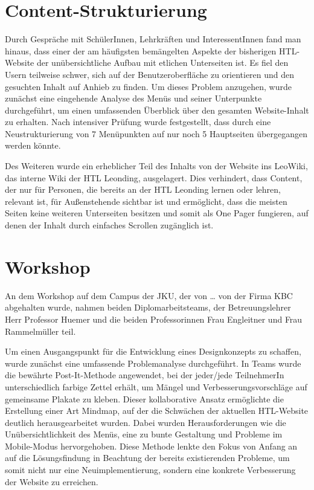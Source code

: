 \section{Content-Strukturierung}
Durch Gespräche mit SchülerInnen, Lehrkräften und InteressentInnen fand man hinaus, dass einer der am häufigsten bemängelten Aspekte der bisherigen 
HTL-Website der unübersichtliche Aufbau mit etlichen Unterseiten ist. Es fiel den Usern teilweise schwer, sich auf der Benutzeroberfläche zu orientieren 
und den gesuchten Inhalt auf Anhieb zu finden. Um dieses Problem anzugehen, wurde zunächst eine eingehende Analyse des Menüs und seiner Unterpunkte durchgeführt, 
um einen umfassenden Überblick über den gesamten Website-Inhalt zu erhalten. Nach intensiver Prüfung wurde festgestellt, dass durch eine Neustrukturierung von 
7 Menüpunkten auf nur noch 5 Hauptseiten übergegangen werden könnte.

Des Weiteren wurde ein erheblicher Teil des Inhalts von der Website ins LeoWiki, das interne Wiki der HTL Leonding, ausgelagert. 
Dies verhindert, dass Content, der nur für Personen, die bereits an der HTL Leonding lernen oder lehren, relevant ist, für Außenstehende sichtbar ist und ermöglicht, 
dass die meisten Seiten keine weiteren Unterseiten besitzen und somit als One Pager fungieren, auf denen der Inhalt durch einfaches Scrollen zugänglich ist.



\section{Workshop}
An dem Workshop auf dem Campus der JKU, der von … von der Firma KBC abgehalten wurde, nahmen beiden Diplomarbeitsteams, der Betreuungslehrer Herr Professor Huemer und die beiden Professorinnen 
Frau Engleitner und Frau Rammelmüller teil. 

Um einen Ausgangspunkt für die Entwicklung eines Designkonzepts zu schaffen, 
wurde zunächst eine umfassende Problemanalyse durchgeführt. In Teams wurde die bewährte Post-It-Methode angewendet, 
bei der jeder/jede TeilnehmerIn unterschiedlich farbige Zettel erhält, um Mängel und Verbesserungsvorschläge auf gemeinsame Plakate zu kleben. 
Dieser kollaborative Ansatz ermöglichte die Erstellung einer Art Mindmap, auf der die Schwächen der aktuellen HTL-Website deutlich herausgearbeitet wurden. 
Dabei wurden Herausforderungen wie die Unübersichtlichkeit des Menüs, eine zu bunte Gestaltung und Probleme im Mobile-Modus hervorgehoben. 
Diese Methode lenkte den Fokus von Anfang an auf die Lösungsfindung in Beachtung der bereits existierenden Probleme, um somit nicht nur eine Neuimplementierung, 
sondern eine konkrete Verbesserung der Website zu erreichen.

